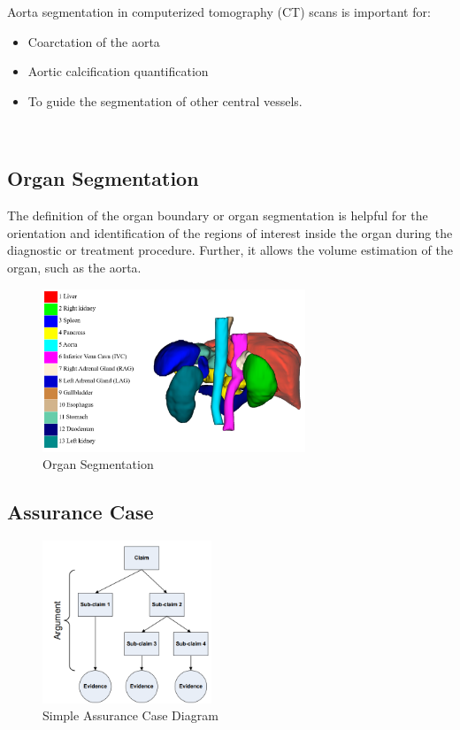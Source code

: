 Aorta segmentation in computerized tomography (CT) scans is important for:
\begin{itemize}
\item Coarctation of the aorta
\item Aortic calcification quantification
\item To guide the segmentation of other central vessels. 
\end{itemize} ~\\

\subsection{Organ Segmentation}
The definition of the organ boundary or organ segmentation is helpful for the orientation and identification of the regions of interest inside the organ during the diagnostic or treatment procedure. Further, it allows the volume estimation of the organ, such as the aorta.

\begin{figure}[ht]
    \centering
    \includegraphics[width=0.7\textwidth]{figures/Intro/segmentation.png}
    \caption[Organ Segmentation]{Organ Segmentation \cite{Ma-2021-AbdomenCT-1K}}
    \label{fig_seg}
\end{figure}

\subsection{Assurance Case}

\begin{figure}[ht]
    \centering
    \includegraphics[width=0.45\textwidth]{figures/Intro/ac_diagram.png}
    \caption[Simple Assurance Case Diagram]{Simple Assurance Case Diagram \cite{doi:10.2514/6.2009-1921}}
    \label{fig_ac_diagram}
\end{figure}



